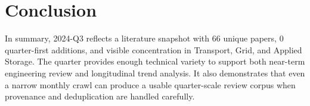 \documentclass[conference]{IEEEtran}
\begin{document}
\section{Conclusion}
In summary, 2024-Q3 reflects a literature snapshot with 66 unique papers, 0 quarter-first additions, and visible concentration in Transport, Grid, and Applied Storage. The quarter provides enough technical variety to support both near-term engineering review and longitudinal trend analysis. It also demonstrates that even a narrow monthly crawl can produce a usable quarter-scale review corpus when provenance and deduplication are handled carefully.



\end{document}

